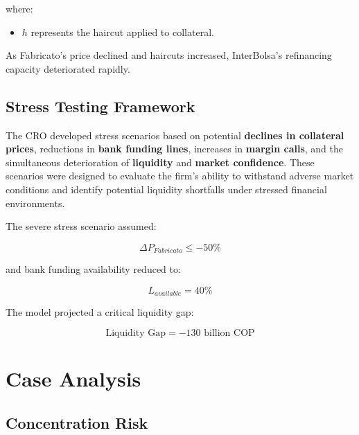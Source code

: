 where:

\begin{itemize}
    \item $h$ represents the haircut applied to collateral.
\end{itemize}

As Fabricato's price declined and haircuts increased, InterBolsa's refinancing capacity deteriorated rapidly.

\vspace{0.3cm}

\subsection{Stress Testing Framework}

The CRO developed stress scenarios based on potential \textbf{declines in collateral prices}, reductions in \textbf{bank funding lines}, increases in \textbf{margin calls}, and the simultaneous deterioration of \textbf{liquidity} and \textbf{market confidence}. These scenarios were designed to evaluate the firm's ability to withstand adverse market conditions and identify potential liquidity shortfalls under stressed financial environments.

The severe stress scenario assumed:

\begin{equation}
\Delta P_{Fabricato} \leq -50\%
\end{equation}

and bank funding availability reduced to:

\begin{equation}
L_{available} = 40\%
\end{equation}

The model projected a critical liquidity gap:

\begin{equation}
\text{Liquidity Gap} = -130 \text{ billion COP}
\end{equation}

\vspace{0.5cm}

\section{Case Analysis}

\subsection{Concentration Risk}

